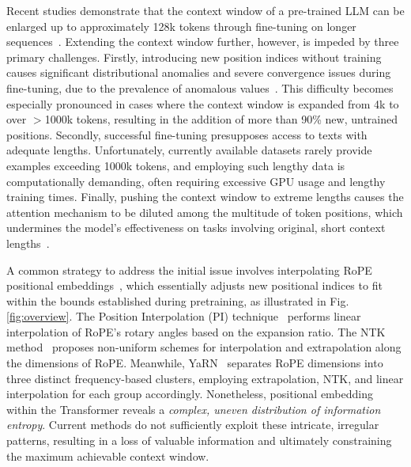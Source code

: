 Recent studies demonstrate that the context window of a pre-trained LLM can be enlarged up to approximately 128k tokens through fine-tuning on longer sequences~\cite{longlora,pi,yarn,zhang2024soaring,liu2023scaling}. Extending the context window further, however, is impeded by three primary challenges. Firstly, introducing new position indices without training causes significant distributional anomalies and severe convergence issues during fine-tuning, due to the prevalence of anomalous values~\cite{pi}. This difficulty becomes especially pronounced in cases where the context window is expanded from 4k to over $>$1000k tokens, resulting in the addition of more than 90\% new, untrained positions. Secondly, successful fine-tuning presupposes access to texts with adequate lengths. Unfortunately, currently available datasets rarely provide examples exceeding 1000k tokens, and employing such lengthy data is computationally demanding, often requiring excessive GPU usage and lengthy training times. Finally, pushing the context window to extreme lengths causes the attention mechanism to be diluted among the multitude of token positions, which undermines the model's effectiveness on tasks involving original, short context lengths~\cite{pi}.

A common strategy to address the initial issue involves interpolating RoPE positional embeddings~\cite{rope,pi}, which essentially adjusts new positional indices to fit within the bounds established during pretraining, as illustrated in Fig.\ref{fig:overview}. The Position Interpolation (PI) technique~\cite{pi} performs linear interpolation of RoPE's rotary angles based on the expansion ratio. The NTK method~\cite{ntk,dynamicntk} proposes non-uniform schemes for interpolation and extrapolation along the dimensions of RoPE. Meanwhile, YaRN~\cite{yarn} separates RoPE dimensions into three distinct frequency-based clusters, employing extrapolation, NTK, and linear interpolation for each group accordingly. Nonetheless, positional embedding within the Transformer reveals a \emph{complex, uneven distribution of information entropy}. Current methods do not sufficiently exploit these intricate, irregular patterns, resulting in a loss of valuable information and ultimately constraining the maximum achievable context window.

